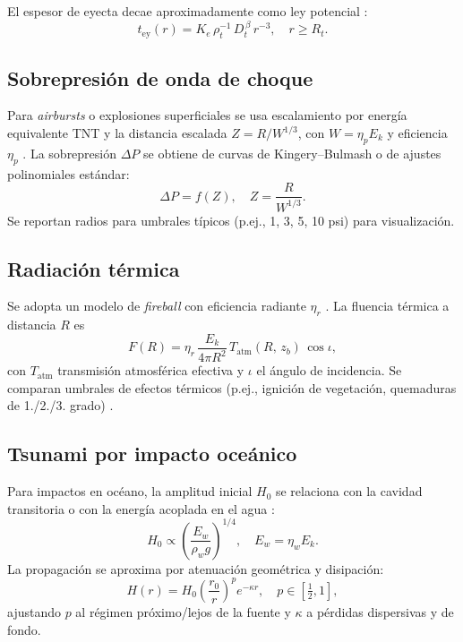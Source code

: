 \documentclass[conference]{IEEEtran}
\begin{document}
El espesor de eyecta decae aproximadamente como ley potencial \cite{mcgetchin1973,housen2011}:
\begin{equation}
    t_{\text{ey}}(r) = K_e \, \rho_t^{-1} \, D_t^{\,\beta} \, r^{-3}, \quad r \ge R_t.
\end{equation}

\subsection{Sobrepresión de onda de choque}
Para \emph{airbursts} o explosiones superficiales se usa escalamiento por energía equivalente TNT y la distancia escalada $Z = R/W^{1/3}$, con $W = \eta_p E_k$ y eficiencia $\eta_p$ \cite{kingery1984,ufc334002,collins2005}. La sobrepresión $\Delta P$ se obtiene de curvas de Kingery--Bulmash o de ajustes polinomiales estándar:
\begin{equation}
    \Delta P = f(Z), \quad Z = \frac{R}{W^{1/3}}.
\end{equation}
Se reportan radios para umbrales típicos (p.ej., 1, 3, 5, 10 psi) para visualización.

\subsection{Radiación térmica}
Se adopta un modelo de \emph{fireball} con eficiencia radiante $\eta_r$ \cite{glasstone1977,collins2005}. La fluencia térmica a distancia $R$ es
\begin{equation}
    F(R) = \eta_r \, \frac{E_k}{4\pi R^2} \, T_{\text{atm}}(R,\,z_b) \, \cos\iota,
\end{equation}
con $T_{\text{atm}}$ transmisión atmosférica efectiva y $\iota$ el ángulo de incidencia. Se comparan umbrales de efectos térmicos (p.ej., ignición de vegetación, quemaduras de 1./2./3. grado) \cite{glasstone1977}.

\subsection{Tsunami por impacto oceánico}
Para impactos en océano, la amplitud inicial $H_0$ se relaciona con la cavidad transitoria o con la energía acoplada en el agua \cite{ward2000,wuennemann2010}:
\begin{equation}
    H_0 \propto \left( \frac{E_w}{\rho_w g} \right)^{1/4}, \quad E_w = \eta_w E_k.
\end{equation}
La propagación se aproxima por atenuación geométrica y disipación:
\begin{equation}
    H(r) = H_0 \left( \frac{r_0}{r} \right)^p e^{-\kappa r}, \quad p\in[\tfrac{1}{2},1],
\end{equation}
ajustando $p$ al régimen próximo/lejos de la fuente y $\kappa$ a pérdidas dispersivas y de fondo.
\end{document}
